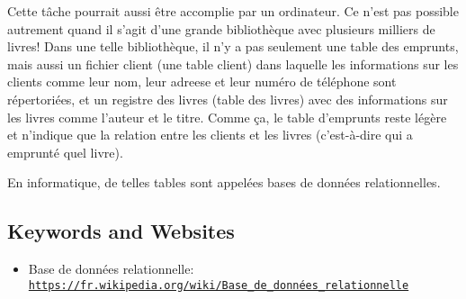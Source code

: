 \documentclass[a4paper,11pt]{report}
\newcommand{\BrochureUrlText}[1]{\texttt{#1}}
\begin{document}
Cette tâche pourrait aussi être accomplie par un ordinateur. Ce n’est pas possible autrement quand il s’agit d’une grande bibliothèque avec plusieurs milliers de livres! Dans une telle bibliothèque, il n’y a pas seulement une table des emprunts, mais aussi un fichier client (une table client) dans laquelle les informations sur les clients comme leur nom, leur adreese et leur numéro de téléphone sont répertoriées, et un registre des livres (table des livres) avec des informations sur les livres comme l’auteur et le titre. Comme ça, le table d’emprunts reste légère et n’indique que la relation entre les clients et les livres (c’est-à-dire qui a emprunté quel livre).

En informatique, de telles tables sont appelées bases de données relationnelles.

{\raggedright

\subsection*{Keywords and Websites}

\begin{itemize}
  \item Base de données relationnelle: \href{https://fr.wikipedia.org/wiki/Base_de_donn\%C3\%A9es_relationnelle}{\BrochureUrlText{https://fr.wikipedia.org/wiki/Base\_de\_données\_relationnelle}}
\end{itemize}


}
\end{document}
